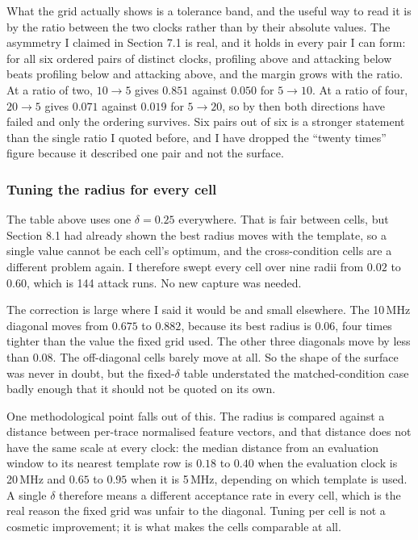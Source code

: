 \documentclass[11pt,a4paper]{article}
\begin{document}
What the grid actually shows is a tolerance band, and the useful way to read it is by the
ratio between the two clocks rather than by their absolute values. The asymmetry I claimed
in Section 7.1 is real, and it holds in every pair I can form: for all six ordered pairs of
distinct clocks, profiling above and attacking below beats profiling below and attacking
above, and the margin grows with the ratio. At a ratio of two, $10 \to 5$ gives $0.851$
against $0.050$ for $5 \to 10$. At a ratio of four, $20 \to 5$ gives $0.071$ against
$0.019$ for $5 \to 20$, so by then both directions have failed and only the ordering
survives. Six pairs out of six is a stronger statement than the single ratio I quoted
before, and I have dropped the ``twenty times'' figure because it described one pair and
not the surface.

\subsubsection*{Tuning the radius for every cell}

The table above uses one $\delta = 0.25$ everywhere. That is fair between cells, but
Section 8.1 had already shown the best radius moves with the template, so a single value
cannot be each cell's optimum, and the cross-condition cells are a different problem again.
I therefore swept every cell over nine radii from $0.02$ to $0.60$, which is 144 attack
runs. No new capture was needed.

\begin{table}[h]
  \centering
  \small
  
  \caption{The same surface with $\delta$ tuned for each cell, the chosen value in
  parentheses. The matched-condition diagonal is in italics. No cell peaks at either end
  of the swept range, so every optimum is bracketed.}
  \label{tab:gridbest}
\end{table}

The correction is large where I said it would be and small elsewhere. The 10\,MHz diagonal
moves from $0.675$ to $0.882$, because its best radius is $0.06$, four times tighter than
the value the fixed grid used. The other three diagonals move by less than $0.08$. The
off-diagonal cells barely move at all. So the shape of the surface was never in doubt, but
the fixed-$\delta$ table understated the matched-condition case badly enough that it should
not be quoted on its own.

One methodological point falls out of this. The radius is compared against a distance
between per-trace normalised feature vectors, and that distance does not have the same
scale at every clock: the median distance from an evaluation window to its nearest template
row is $0.18$ to $0.40$ when the evaluation clock is 20\,MHz and $0.65$ to $0.95$ when it is
5\,MHz, depending on which template is used. A single $\delta$ therefore
means a different acceptance rate in every cell, which is the real reason the fixed grid
was unfair to the diagonal. Tuning per cell is not a cosmetic improvement; it is what makes
the cells comparable at all.
\end{document}
